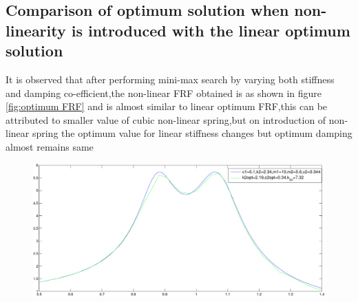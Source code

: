   \subsection{Comparison of optimum solution when non-linearity is introduced with the linear optimum solution}
  It is observed that after performing mini-max search by varying both stiffness and damping co-efficient,the non-linear FRF obtained is as shown in figure \ref{fig:optimum FRF} and is almost similar to linear optimum FRF,this can be attributed to smaller value of cubic non-linear spring,but on introduction of non-linear spring the optimum value for linear stiffness changes but optimum damping almost remains same
  \begin{figure}
  \includegraphics[scale=0.6]{"figures/nonlinerassoptimal"}
  \end{figure}

